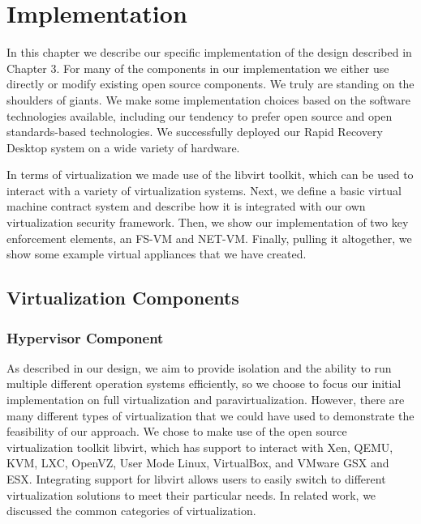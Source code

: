 
\chapter{Implementation}

In this chapter we describe our specific implementation of the design described in Chapter 3. For many of the components in our implementation we either use directly or modify existing open source components. We truly are standing on the shoulders of giants\cite{ben-yehuda_osr_2008}. We make some implementation choices based on the software technologies available, including our tendency to prefer open source and open standards-based technologies. We successfully deployed our Rapid Recovery Desktop system on a wide variety of hardware. 

In terms of virtualization we made use of the libvirt toolkit\cite{libvirt_website}, which can be used to interact with a variety of virtualization systems. Next, we define a basic virtual machine contract system and describe how it is integrated with our own virtualization security framework. Then, we show our implementation of two key enforcement elements, an FS-VM and NET-VM. Finally, pulling it altogether, we show some example virtual appliances that we have created. 

\section{Virtualization Components}

\subsection{Hypervisor Component}

As described in our design, we aim to provide isolation and the ability to run multiple different operation systems efficiently, so we choose to focus our initial implementation on full virtualization and paravirtualization. However, there are many different types of virtualization that we could have used to demonstrate the feasibility of our approach.  We chose to make use of the open source virtualization toolkit libvirt, which has support to interact with Xen, QEMU, KVM, LXC, OpenVZ, User Mode Linux, VirtualBox, and VMware GSX and ESX\cite{libvirt_website}. Integrating support for libvirt allows users to easily switch to different virtualization solutions to meet their particular needs. In related work, we discussed the common categories of virtualization.

